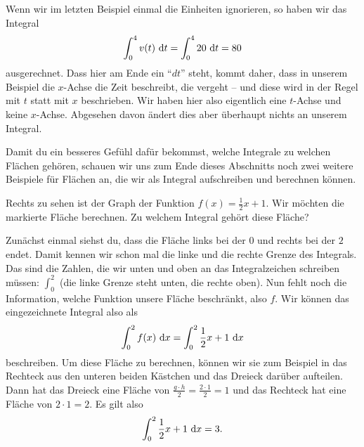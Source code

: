 \documentclass[../../main.tex]{subfiles}
\begin{document}
\begin{example}{}
    Wenn wir im letzten Beispiel einmal die Einheiten ignorieren, so haben wir das Integral
    \[\int_0^4v(t)\mathop{}\mathrm{d} t=\int_0^420\mathop{}\mathrm{d} t=80\]
    ausgerechnet. Dass hier am Ende ein \enquote{$dt$} steht, kommt daher, dass in unserem Beispiel die $x$-Achse die
    Zeit beschreibt, die vergeht -- und diese wird in der Regel mit $t$ statt mit $x$ beschrieben. Wir haben hier also
    eigentlich eine $t$-Achse und keine $x$-Achse. Abgesehen davon
    ändert dies aber überhaupt nichts an unserem Integral.
\end{example}

Damit du ein besseres Gefühl dafür bekommst, welche Integrale zu welchen Flächen gehören, schauen wir uns zum Ende dieses
Abschnitts noch zwei weitere Beispiele für Flächen an, die wir als Integral aufschreiben und berechnen können.
\begin{example}{}
    Rechts zu sehen ist der Graph der Funktion $f(x)=\frac{1}{2}x+1$. Wir möchten die markierte Fläche berechnen. Zu
    welchem Integral gehört diese Fläche?

    Zunächst einmal siehst du, dass die Fläche links bei der $0$ und rechts bei der $2$ endet. Damit kennen wir schon
    mal die linke und die rechte Grenze des Integrals. Das sind die Zahlen, die wir unten und oben an das Integralzeichen
    schreiben müssen: $\displaystyle \int_0^2$ (die linke Grenze steht unten, die rechte oben). Nun fehlt noch die Information,
    welche Funktion unsere Fläche beschränkt, also $f$. Wir können das eingezeichnete Integral also als
    \[\int_0^2f(x)\mathop{}\mathrm{d} x=\int_0^2\frac{1}{2}x+1\mathop{}\mathrm{d} x\]
    beschreiben. Um diese Fläche zu berechnen, können wir sie zum Beispiel in das Rechteck aus den unteren beiden 
    Kästchen und das Dreieck darüber aufteilen. Dann hat das Dreieck eine Fläche von 
    $\frac{g\cdot h}{2}=\frac{2\cdot 1}{2}=1$ und das Rechteck hat eine Fläche von $2\cdot 1=2$. Es gilt also
    \[\int_0^2\frac{1}{2}x+1\mathop{}\mathrm{d} x=3.\]
\end{example}
\end{document}
